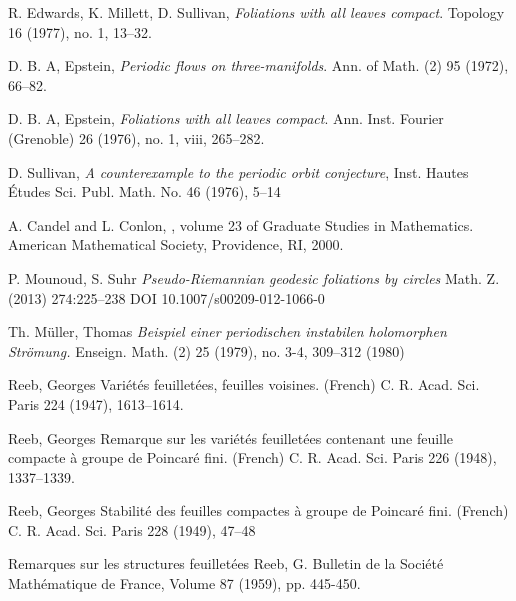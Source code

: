 \documentclass[A4paper,11pt]{amsart}
\theoremstyle{definition}
\theoremstyle{named}
\begin{document}
 \begin{thebibliography}{100000000}
 
   R. Edwards, K. Millett, D. Sullivan,  {\em Foliations with all leaves compact}. Topology 16 (1977), no. 1, 13--32.
 
  D. B. A, Epstein, {\em Periodic flows on three-manifolds}. Ann. of Math. (2) 95 (1972), 66--82. 
 
  D. B. A, Epstein, {\em Foliations with all leaves compact}. Ann. Inst. Fourier (Grenoble) 26 (1976), no. 1, viii, 265--282.
 
  D. Sullivan, {\em A counterexample to the periodic orbit conjecture}, Inst. Hautes Études Sci. Publ. Math. No. 46 (1976), 5--14
 
A. Candel and L. Conlon,
, volume 23 of Graduate Studies in
  Mathematics.
\newblock American Mathematical Society, Providence, RI, 2000.
 
  P. Mounoud, S. Suhr
 {\em Pseudo-Riemannian geodesic foliations by circles} Math. Z. (2013) 274:225--238
DOI 10.1007/s00209-012-1066-0 
 
 Th.  Müller, Thomas
{\em Beispiel einer periodischen instabilen holomorphen Strömung. }
Enseign. Math. (2) 25 (1979), no. 3-4, 309--312 (1980)

 Reeb, Georges Variétés feuilletées, feuilles voisines. (French) C. R. Acad. Sci. Paris 224 (1947), 1613--1614. 

Reeb, Georges Remarque sur les variétés feuilletées contenant une feuille compacte à groupe de Poincaré fini. (French) C. R. Acad. Sci. Paris 226 (1948), 1337–1339.

Reeb, Georges Stabilité des feuilles compactes à groupe de Poincaré fini. (French) C. R. Acad. Sci. Paris 228 (1949), 47–48

 Remarques sur les structures feuilletées
Reeb, G.
Bulletin de la Société Mathématique de France, Volume 87 (1959), pp. 445-450. 

\end{thebibliography}
\end{document}
